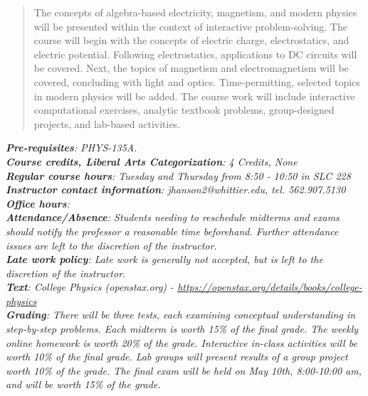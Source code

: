 \documentclass[10pt]{article}
\begin{document}
\maketitle

\begin{abstract}
The concepts of algebra-based electricity, magnetism, and modern physics will be presented within the context of interactive problem-solving.  The course will begin with the concepts of electric charge, electrostatics, and electric potential.  Following electrostatics, applications to DC circuits will be covered.  Next, the topics of magnetism and electromagnetism will be covered, concluding with light and optics.  Time-permitting, selected topics in modern physics will be added.  The course work will include interactive computational exercises, analytic textbook problems, group-designed projects, and lab-based activities.
\end{abstract}
\noindent
\textit{\textbf{Pre-requisites}: PHYS-135A.} \\
\textit{\textbf{Course credits, Liberal Arts Categorization}: 4 Credits, None} \\
\textit{\textbf{Regular course hours}: Tuesday and Thursday from 8:50 - 10:50 in SLC 228} \\
\textit{\textbf{Instructor contact information}: jhanson2@whittier.edu, tel. 562.907.5130} \\
\textit{\textbf{Office hours}: } \\
\textit{\textbf{Attendance/Absence}: Students needing to reschedule midterms and exams should notify the professor a reasonable time beforehand. Further attendance issues are left to the discretion of the instructor}.\\ 
\textit{\textbf{Late work policy}: Late work is generally not accepted, but is left to the discretion of the instructor.} \\
\textit{\textbf{Text}: College Physics (openstax.org) -  \url{https://openstax.org/details/books/college-physics}} \\
\textit{\textbf{Grading}: There will be three tests, each examining conceptual understanding in step-by-step problems. Each midterm is worth 15\% of the final grade. The weekly online homework is worth 20\% of the grade. Interactive in-class activities will be worth 10\% of the final grade. Lab groups will present results of a group project worth 10\% of the grade. The final exam will be held on May 10th, 8:00-10:00 am, and will be worth 15\% of the grade.} \\
\end{document}
